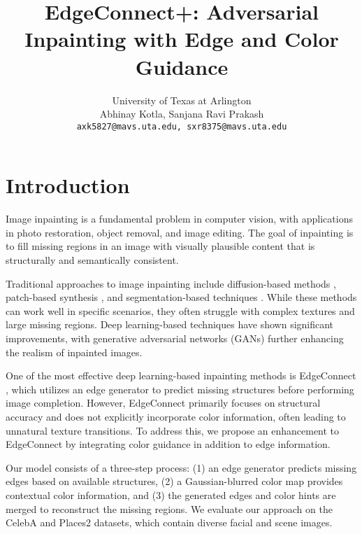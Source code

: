 \documentclass[10pt,twocolumn,letterpaper]{article}
\begin{document}
\title{EdgeConnect+: Adversarial Inpainting with Edge and Color Guidance}

\author{
University of Texas at Arlington\\
Abhinay Kotla, Sanjana Ravi Prakash\\
{\tt\small axk5827@mavs.uta.edu, sxr8375@mavs.uta.edu}
}

\maketitle
\thispagestyle{empty}

\section{Introduction}
Image inpainting is a fundamental problem in computer vision, with applications in photo restoration, object removal, and image editing. The goal of inpainting is to fill missing regions in an image with visually plausible content that is structurally and semantically consistent. 

Traditional approaches to image inpainting include diffusion-based methods \cite{ballester2001filling, bertalmio2000image}, patch-based synthesis \cite{darabi2012image}, and segmentation-based techniques \cite{esedoglu2002digital}. While these methods can work well in specific scenarios, they often struggle with complex textures and large missing regions. Deep learning-based techniques \cite{pathak2016context} have shown significant improvements, with generative adversarial networks (GANs) \cite{goodfellow2014gan} further enhancing the realism of inpainted images.

One of the most effective deep learning-based inpainting methods is EdgeConnect \cite{nazeri2019edgeconnect}, which utilizes an edge generator to predict missing structures before performing image completion. However, EdgeConnect primarily focuses on structural accuracy and does not explicitly incorporate color information, often leading to unnatural texture transitions. To address this, we propose an enhancement to EdgeConnect by integrating color guidance in addition to edge information. 

Our model consists of a three-step process: (1) an edge generator predicts missing edges based on available structures, (2) a Gaussian-blurred color map provides contextual color information, and (3) the generated edges and color hints are merged to reconstruct the missing regions. We evaluate our approach on the CelebA and Places2 datasets, which contain diverse facial and scene images.
\end{document}

